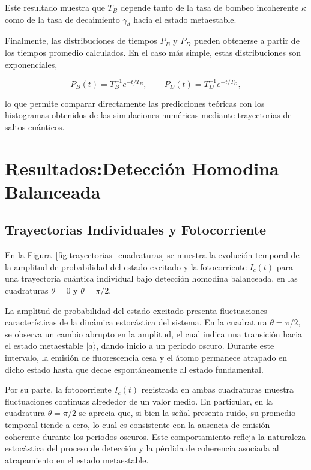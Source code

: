 \documentclass[12pt]{article}
\newcommand{\ket}[1]{\lvert #1 \rangle}
\begin{document}
Este resultado muestra que $T_B$ depende tanto de la tasa de bombeo incoherente $\kappa$ como de la tasa de decaimiento $\gamma_d$ hacia el estado metaestable.

Finalmente, las distribuciones de tiempos $P_B$ y $P_D$ pueden obtenerse a partir de los tiempos promedio calculados. En el caso más simple, estas distribuciones son exponenciales,

\begin{equation}
P_B(t) = T_B^{-1} e^{-t/T_B}, \qquad P_D(t) = T_D^{-1} e^{-t/T_D},
\end{equation}

lo que permite comparar directamente las predicciones teóricas con los histogramas obtenidos de las simulaciones numéricas mediante trayectorias de saltos cuánticos.
\section{Resultados:Detección Homodina Balanceada }

\subsection{Trayectorias Individuales y Fotocorriente}

En la Figura~\ref{fig:trayectorias_cuadraturas} se muestra la evolución temporal de la amplitud de probabilidad del estado excitado y la fotocorriente $I_c(t)$ para una trayectoria cuántica individual bajo detección homodina balanceada, en las cuadraturas $\theta = 0$ y $\theta = \pi/2$. 

La amplitud de probabilidad del estado excitado presenta fluctuaciones características de la dinámica estocástica del sistema. En la cuadratura $\theta = \pi/2$, se observa un cambio abrupto en la amplitud, el cual indica una transición hacia el estado metaestable $\ket{a}$, dando inicio a un periodo oscuro. Durante este intervalo, la emisión de fluorescencia cesa y el átomo permanece atrapado en dicho estado hasta que decae espontáneamente al estado fundamental.

Por su parte, la fotocorriente $I_c(t)$ registrada en ambas cuadraturas muestra fluctuaciones continuas alrededor de un valor medio. En particular, en la cuadratura $\theta = \pi/2$ se aprecia que, si bien la señal presenta ruido, su promedio temporal tiende a cero, lo cual es consistente con la ausencia de emisión coherente durante los periodos oscuros. Este comportamiento refleja la naturaleza estocástica del proceso de detección y la pérdida de coherencia asociada al atrapamiento en el estado metaestable.
\end{document}
